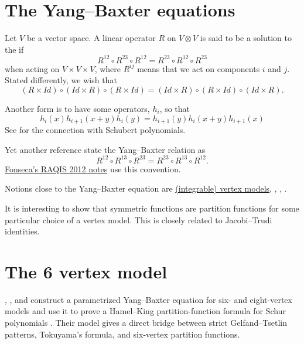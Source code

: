
\section[yangBaxter]{The Yang--Baxter equations}


Let $V$ be a vector space. A linear operator $R$ on $V\otimes V$
is said to be a solution to the  if
\[
R^{12} \circ R^{23} \circ R^{12} = R^{23} \circ R^{12} \circ R^{23} 
\]
when acting on $V \times V \times V$,
where $R^{ij}$ means that we act on components $i$ and $j$.
Stated differently, we wish that
\[
(R \times Id)\circ 
(Id \times R)\circ (R \times Id) =
(Id \times R) \circ (R \times Id) \circ (Id \times R).
\]

Another form is to have some operators, $h_i$, so that
\[
h_i(x)h_{i+1}(x+y)h_i(y) = h_{i+1}(y) h_{i}(x+y) h_{i+1}(x) 
\]
See \cite{FominKirillov1996YangBaxter} for the connection with Schubert
polynomials.

Yet another reference state the Yang--Baxter relation as
\[
R^{12} \circ R^{13} \circ R^{23} = R^{23} \circ R^{13} \circ R^{12}.
\]
\href{https://lapth.cnrs.fr/conferences/RAQIS/RAQIS12/pdfRAQIS12/fonseca.pdf}{Fonseca's
RAQIS 2012 notes} use this convention.


Notions close to the Yang--Baxter equation are
\hyperref[latticeModelYangBaxter]{(integrable) vertex models},
, , .

It is interesting to show that symmetric functions are partition functions for 
some particular choice of a vertex model.
This is closely related to Jacobi--Trudi identities.


\section[6vertexModel]{The 6 vertex model}


, , and 
construct a parametrized Yang--Baxter equation for six- and eight-vertex
models and use it to prove a Hamel--King partition-function formula for
Schur polynomials \cite{BrubakerBumpFriedberg2011}.  Their model gives a
direct bridge between strict Gelfand--Tsetlin patterns, Tokuyama's formula,
and six-vertex partition functions.

